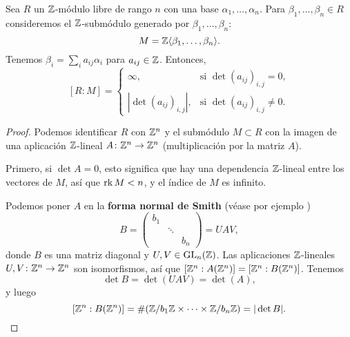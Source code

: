 \begin{lema}
  Sea $R$ un $\mathbb{Z}$-módulo libre de rango $n$ con una base
  $\alpha_1,\ldots,\alpha_n$. Para $\beta_1,\ldots,\beta_n \in R$
  consideremos el $\mathbb{Z}$-submódulo generado por $\beta_1,\ldots,\beta_n$:
  $$M = \mathbb{Z} \langle\beta_1,\ldots,\beta_n\rangle.$$
  Tenemos $\beta_i = \sum_i a_{ij} \alpha_i$ para $a_{ij} \in \mathbb{Z}$.
  Entonces,
  \[ [R : M] = \begin{cases}
    \infty, & \text{si }\det (a_{ij})_{i,j} = 0, \\
    |\det (a_{ij})_{i,j}|, & \text{si }\det (a_{ij})_{i,j} \ne 0.
    \end{cases} \]

  \begin{proof}
    Podemos identificar $R$ con $\mathbb{Z}^n$ y el submódulo $M \subset R$
    con la imagen de una aplicación $\mathbb{Z}$-lineal $A\colon\mathbb{Z}^n \to \mathbb{Z}^n$
    (multiplicación por la matriz $A$).

    Primero, si $\det A = 0$, esto significa que hay una dependencia
    $\mathbb{Z}$-lineal entre los vectores de $M$, así que $\operatorname{rk} M < n$,
    y el índice de $M$ es infinito.

    Podemos poner $A$ en la \textbf{forma normal de Smith} (véase
    por ejemplo \cite[Chapter 2]{Cohen-GTM138})
    \[ B = \begin{pmatrix}
      b_1 \\
      & \ddots \\
      & & b_n
      \end{pmatrix} = U A V, \]
    donde $B$ es una matriz diagonal y $U, V \in \operatorname{GL}_n (\mathbb{Z})$.
    Las aplicaciones $\mathbb{Z}$-lineales $U, V\colon \mathbb{Z}^n\to \mathbb{Z}^n$ son
    isomorfismos, así que $[\mathbb{Z}^n : A (\mathbb{Z}^n)] = [\mathbb{Z}^n : B (\mathbb{Z}^n)]$.
    Tenemos
    $$\det B = \det (U A V) = \det (A),$$
    y luego
    \[ [\mathbb{Z}^n : B (\mathbb{Z}^n)] = \# (\mathbb{Z}/b_1\mathbb{Z} \times \cdots \times \mathbb{Z}/b_n\mathbb{Z})
       = |\det B|. \qedhere \]
  \end{proof}
\end{lema}

